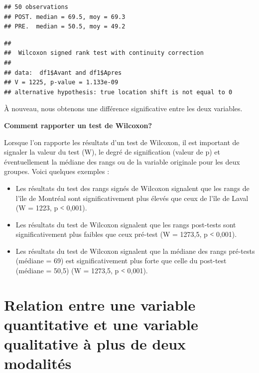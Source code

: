 \documentclass[
  11pt,
  french,
]{book}
\makeatletter
\newenvironment{Shaded}{\begin{snugshade}}{\end{snugshade}}
\newcommand{\DataTypeTok}[1]{\textcolor[rgb]{0.13,0.29,0.53}{#1}}
\newcommand{\KeywordTok}[1]{\textcolor[rgb]{0.13,0.29,0.53}{\textbf{#1}}}
\newcommand{\NormalTok}[1]{#1}
\newcommand{\OperatorTok}[1]{\textcolor[rgb]{0.81,0.36,0.00}{\textbf{#1}}}
\newcommand{\OtherTok}[1]{\textcolor[rgb]{0.56,0.35,0.01}{#1}}
\providecommand{\tightlist}{%
  \setlength{\itemsep}{0pt}\setlength{\parskip}{0pt}}
\newenvironment{kframe}{%
\medskip{}
\setlength{\fboxsep}{.8em}
 \def\at@end@of@kframe{}%
 \ifinner\ifhmode%
  \def\at@end@of@kframe{\end{minipage}}%
  \begin{minipage}{\columnwidth}%
 \fi\fi%
 \def\FrameCommand##1{\hskip\@totalleftmargin \hskip-\fboxsep
 \colorbox{shadecolor}{##1}\hskip-\fboxsep
     \hskip-\linewidth \hskip-\@totalleftmargin \hskip\columnwidth}%
 \MakeFramed {\advance\hsize-\width
   \@totalleftmargin\z@ \linewidth\hsize
   \@setminipage}}%
 {\par\unskip\endMakeFramed%
 \at@end@of@kframe}
\renewenvironment{Shaded}{\begin{kframe}}{\end{kframe}}
\makeatother
\begin{document}
\begin{verbatim}
## 50 observations
## POST. median = 69.5, moy = 69.3
## PRE.  median = 50.5, moy = 49.2
\end{verbatim}

\begin{Shaded}
\end{Shaded}

\begin{verbatim}
## 
## 	Wilcoxon signed rank test with continuity correction
## 
## data:  df1$Avant and df1$Apres
## V = 1225, p-value = 1.133e-09
## alternative hypothesis: true location shift is not equal to 0
\end{verbatim}

À nouveau, nous obtenons une différence significative entre les deux variables.

\textbf{Comment rapporter un test de Wilcoxon?}

Lorsque l'on rapporte les résultats d'un test de Wilcoxon, il est important de signaler la valeur du test (W), le degré de signification (valeur de p) et éventuellement la médiane des rangs ou de la variable originale pour les deux groupes. Voici quelques exemples :

\begin{itemize}
\tightlist
\item
  Les résultats du test des rangs signés de Wilcoxon signalent que les rangs de l'île de Montréal sont significativement plus élevés que ceux de l'île de Laval (W = 1223, p ˂ 0,001).
\item
  Les résultats du test de Wilcoxon signalent que les rangs post-tests sont significativement plus faibles que ceux pré-test (W = 1273,5, p ˂ 0,001).
\item
  Les résultats du test de Wilcoxon signalent que la médiane des rangs pré-tests (médiane = 69) est significativement plus forte que celle du post-test (médiane = 50,5) (W = 1273,5, p ˂ 0,001).
\end{itemize}

\hypertarget{sect044}{%
\section{Relation entre une variable quantitative et une variable qualitative à plus de deux modalités}\label{sect044}}
\end{document}
